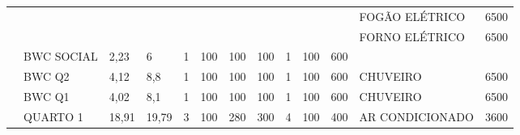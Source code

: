 \begin{table}[H]
{\begin{tabular}{|l|l|ll|llll|lll|ll|}
		&                              & \multicolumn{1}{l|}{}                       &                        & \multicolumn{1}{l|}{}                   & \multicolumn{1}{l|}{}                     & \multicolumn{1}{l|}{}                     &                      & \multicolumn{1}{l|}{}                   & \multicolumn{1}{l|}{}                     &                       & \multicolumn{1}{l|}{FOGÃO ELÉTRICO}       & 6500     \\ \cline{12-13} 
		&                              & \multicolumn{1}{l|}{}                       &                        & \multicolumn{1}{l|}{}                   & \multicolumn{1}{l|}{}                     & \multicolumn{1}{l|}{}                     &                      & \multicolumn{1}{l|}{}                   & \multicolumn{1}{l|}{}                     &                       & \multicolumn{1}{l|}{FORNO ELÉTRICO}       & 6500     \\ \cline{2-13} 
		& BWC SOCIAL                   & \multicolumn{1}{l|}{2,23}                   & 6                      & \multicolumn{1}{l|}{1}                  & \multicolumn{1}{l|}{100}                  & \multicolumn{1}{l|}{100}                  & 100                  & \multicolumn{1}{l|}{1}                  & \multicolumn{1}{l|}{100}                  & 600                   & \multicolumn{1}{l|}{}                     &          \\ \cline{2-13} 
		& BWC Q2                       & \multicolumn{1}{l|}{4,12}                   & 8,8                    & \multicolumn{1}{l|}{1}                  & \multicolumn{1}{l|}{100}                  & \multicolumn{1}{l|}{100}                  & 100                  & \multicolumn{1}{l|}{1}                  & \multicolumn{1}{l|}{100}                  & 600                   & \multicolumn{1}{l|}{CHUVEIRO}             & 6500     \\ \cline{2-13} 
		& BWC Q1                       & \multicolumn{1}{l|}{4,02}                   & 8,1                    & \multicolumn{1}{l|}{1}                  & \multicolumn{1}{l|}{100}                  & \multicolumn{1}{l|}{100}                  & 100                  & \multicolumn{1}{l|}{1}                  & \multicolumn{1}{l|}{100}                  & 600                   & \multicolumn{1}{l|}{CHUVEIRO}             & 6500     \\ \cline{2-13} 
		& QUARTO 1                     & \multicolumn{1}{l|}{18,91}                  & 19,79                  & \multicolumn{1}{l|}{3}                  & \multicolumn{1}{l|}{100}                  & \multicolumn{1}{l|}{280}                  & 300                  & \multicolumn{1}{l|}{4}                  & \multicolumn{1}{l|}{100}                  & 400                   & \multicolumn{1}{l|}{AR CONDICIONADO}      & 3600     \\ \cline{2-13} 

\end{tabular}}
\end{table}
